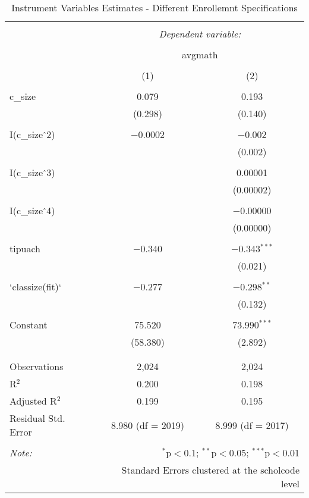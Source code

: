
\begin{table}[!htbp] \centering 
  \caption{Instrument Variables Estimates - Different Enrollemnt Specifications} 
  \label{} 
\begin{tabular}{@{\extracolsep{5pt}}lcc} 
\\[-1.8ex]\hline 
\hline \\[-1.8ex] 
 & \multicolumn{2}{c}{\textit{Dependent variable:}} \\ 
\cline{2-3} 
\\[-1.8ex] & \multicolumn{2}{c}{avgmath} \\ 
\\[-1.8ex] & (1) & (2)\\ 
\hline \\[-1.8ex] 
 c\_size & 0.079 & 0.193 \\ 
  & (0.298) & (0.140) \\ 
  & & \\ 
 I(c\_size$\hat{\mkern6mu}$2) & $-$0.0002 & $-$0.002 \\ 
  &  & (0.002) \\ 
  & & \\ 
 I(c\_size$\hat{\mkern6mu}$3) &  & 0.00001 \\ 
  &  & (0.00002) \\ 
  & & \\ 
 I(c\_size$\hat{\mkern6mu}$4) &  & $-$0.00000 \\ 
  &  & (0.00000) \\ 
  & & \\ 
 tipuach & $-$0.340 & $-$0.343$^{***}$ \\ 
  &  & (0.021) \\ 
  & & \\ 
 `classize(fit)` & $-$0.277 & $-$0.298$^{**}$ \\ 
  &  & (0.132) \\ 
  & & \\ 
 Constant & 75.520 & 73.990$^{***}$ \\ 
  & (58.380) & (2.892) \\ 
  & & \\ 
\hline \\[-1.8ex] 
Observations & 2,024 & 2,024 \\ 
R$^{2}$ & 0.200 & 0.198 \\ 
Adjusted R$^{2}$ & 0.199 & 0.195 \\ 
Residual Std. Error & 8.980 (df = 2019) & 8.999 (df = 2017) \\ 
\hline 
\hline \\[-1.8ex] 
\textit{Note:}  & \multicolumn{2}{r}{$^{*}$p$<$0.1; $^{**}$p$<$0.05; $^{***}$p$<$0.01} \\ 
 & \multicolumn{2}{r}{Standard Errors clustered at the scholcode level} \\ 
\end{tabular} 
\end{table} 
